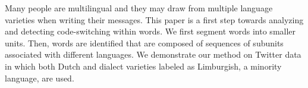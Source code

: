 Many people are multilingual and they may draw from multiple language varieties when writing their messages. This paper is a first step towards analyzing and detecting code-switching within words. We first segment words into smaller units. Then, words are identified that are composed of sequences of subunits associated with different languages. We demonstrate our method on Twitter data in which both Dutch and dialect varieties labeled  as Limburgish, a minority language, are used.
